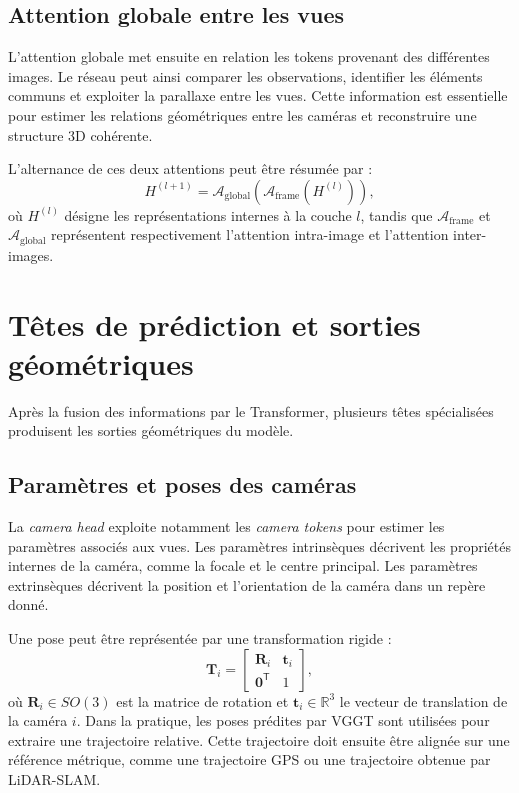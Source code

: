 \documentclass[12pt,a4paper,oneside]{report}
\begin{document}
\subsection{Attention globale entre les vues}

L'attention globale met ensuite en relation les tokens provenant des différentes images. Le réseau peut ainsi comparer les observations, identifier les éléments communs et exploiter la parallaxe entre les vues. Cette information est essentielle pour estimer les relations géométriques entre les caméras et reconstruire une structure 3D cohérente.

L'alternance de ces deux attentions peut être résumée par :
\begin{equation}
    H^{(l+1)} = \mathcal{A}_{\mathrm{global}}
    \left(\mathcal{A}_{\mathrm{frame}}(H^{(l)})\right),
\end{equation}
où $H^{(l)}$ désigne les représentations internes à la couche $l$, tandis que $\mathcal{A}_{\mathrm{frame}}$ et $\mathcal{A}_{\mathrm{global}}$ représentent respectivement l'attention intra-image et l'attention inter-images.

\section{Têtes de prédiction et sorties géométriques}

Après la fusion des informations par le Transformer, plusieurs têtes spécialisées produisent les sorties géométriques du modèle.

\subsection{Paramètres et poses des caméras}

La \textit{camera head} exploite notamment les \textit{camera tokens} pour estimer les paramètres associés aux vues. Les paramètres intrinsèques décrivent les propriétés internes de la caméra, comme la focale et le centre principal. Les paramètres extrinsèques décrivent la position et l'orientation de la caméra dans un repère donné.

Une pose peut être représentée par une transformation rigide :
\begin{equation}
    \mathbf{T}_i =
    \begin{bmatrix}
        \mathbf{R}_i & \mathbf{t}_i \\
        \mathbf{0}^{\mathsf{T}} & 1
    \end{bmatrix},
\end{equation}
où $\mathbf{R}_i \in SO(3)$ est la matrice de rotation et $\mathbf{t}_i \in \mathbb{R}^3$ le vecteur de translation de la caméra $i$. Dans la pratique, les poses prédites par VGGT sont utilisées pour extraire une trajectoire relative. Cette trajectoire doit ensuite être alignée sur une référence métrique, comme une trajectoire GPS ou une trajectoire obtenue par LiDAR-SLAM.
\end{document}
